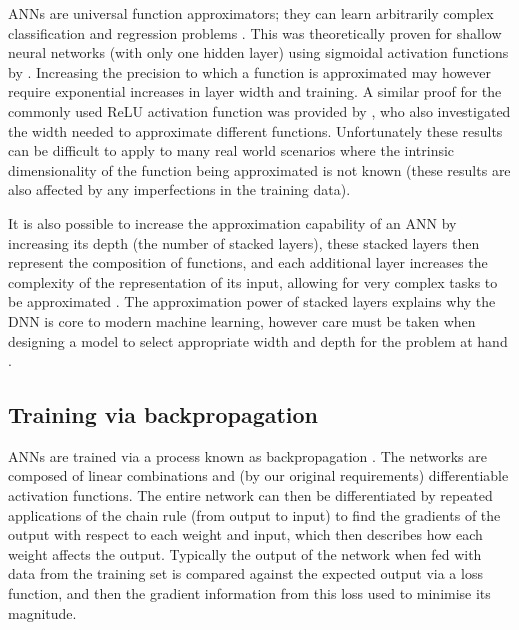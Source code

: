 ANNs are universal function approximators; they can learn arbitrarily complex classification and regression problems \citep{Rumelhart1986,1989Cybenko}.
This was theoretically proven for shallow neural networks (with only one hidden layer) using sigmoidal activation functions by \citet{1989Cybenko}.
Increasing the precision to which a function is approximated may however require exponential increases in layer width and training.
A similar proof for the commonly used ReLU activation function was provided by \citet{Lu2017}, who also investigated the width needed to approximate different functions.
Unfortunately these results can be difficult to apply to many real world scenarios where the intrinsic dimensionality of the function being approximated is not known (these results are also affected by any imperfections in the training data).

It is also possible to increase the approximation capability of an ANN by increasing its depth (the number of stacked layers), these stacked layers then represent the composition of functions, and each additional layer increases the complexity of the representation of its input, allowing for very complex tasks to be approximated \citep{Raschka2015}.
The approximation power of stacked layers explains why the DNN is core to modern machine learning, however care must be taken when designing a model to select appropriate width and depth for the problem at hand \citep{Lu2017}.

\subsection{Training via backpropagation}

ANNs are trained via a process known as backpropagation \citep{Rumelhart1986}.
The networks are composed of linear combinations and (by our original requirements) differentiable activation functions.
The entire network can then be differentiated by repeated applications of the chain rule (from output to input) to find the gradients of the output with respect to each weight and input, which then describes how each weight affects the output.
Typically the output of the network when fed with data from the training set is compared against the expected output via a loss function, and then the gradient information from this loss used to minimise its magnitude.

